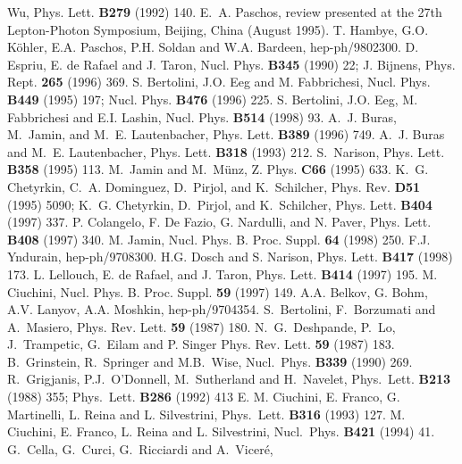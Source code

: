 \begin{thebibliography}{999}
{  Wu},
{ Phys. Lett.} {\bf B279} (1992) 140.
{ E.~A. Paschos},
 review presented at the 27th Lepton-Photon Symposium,
  Beijing, China (August 1995).
T. Hambye, G.O. K\"ohler, E.A. Paschos, P.H. Soldan and W.A. Bardeen,
hep-ph/9802300.
D. Espriu, E. de Rafael and J. Taron, { Nucl. Phys.} {\bf B345} (1990) 22;
J. Bijnens, Phys. Rept. {\bf 265} (1996) 369.
S. Bertolini, J.O. Eeg and  M. Fabbrichesi,
{ Nucl. Phys.} {\bf B449} (1995) 197;
{ Nucl. Phys.} {\bf B476} (1996) 225.
S. Bertolini, J.O. Eeg, M. Fabbrichesi and E.I. Lashin,
{ Nucl. Phys.} {\bf B514} (1998) 93.
{ A.~J. Buras}, { M.~Jamin}, and { M.~E. Lautenbacher},
{ Phys. Lett.} {\bf B389} (1996) 749.
{ A.~J. Buras} and { M.~E. Lautenbacher},
{ Phys. Lett.} {\bf B318} (1993) 212.
{ S.~Narison},
{ Phys. Lett.} {\bf B358} (1995) 113.
{ M.~Jamin} and { M.~M{\"u}nz},
 { Z. Phys.} {\bf C66} (1995) 633.
K.~G. Chetyrkin, C.~A. Dominguez,  D.~Pirjol, and 
  K.~Schilcher,
{ Phys. Rev.} {\bf D51} (1995) 5090;
K.~G. Chetyrkin, D.~Pirjol, and 
  K.~Schilcher,
{ Phys. Lett.} {\bf B404} (1997) 337.
P. Colangelo, F. De Fazio, G. Nardulli, and N. Paver,
{ Phys. Lett.} {\bf B408} (1997) 340.
M. Jamin, Nucl. Phys. B. Proc. Suppl. {\bf 64} (1998) 250.
F.J. Yndurain, hep-ph/9708300.
H.G. Dosch and S. Narison, { Phys. Lett.} {\bf B417} (1998) 173.
L. Lellouch, E. de Rafael, and J. Taron, 
{ Phys. Lett.} {\bf B414} (1997) 195.
{ M. Ciuchini}, Nucl. Phys. B. Proc. Suppl. {\bf 59} (1997) 149.
A.A. Belkov, G. Bohm, A.V. Lanyov, A.A. Moshkin, hep-ph/9704354.
{ S.~Bertolini, F.~Borzumati and A.~Masiero,} 
{ Phys. Rev. Lett.} {\bf 59} (1987) 180.
{ N.~G.~Deshpande, P.~Lo, J.~Trampetic, G.~Eilam and P. Singer}
{ Phys. Rev. Lett.} {\bf 59} (1987) 183.
{ B.~Grinstein, R.~Springer and M.B.~Wise,} 
{ Nucl.~Phys.} {\bf B339} (1990) 269.
{ R.~Grigjanis, P.J.~O'Donnell, M.~Sutherland and H.~Navelet,} 
{ Phys.~Lett.} {\bf B213} (1988) 355;
{ Phys.~Lett.} {\bf B286} (1992) 413 E.
{ M. Ciuchini, E. Franco, G. Martinelli, L. Reina and L. Silvestrini,}
 { Phys.~Lett.} {\bf B316} (1993) 127.
{ M. Ciuchini, E. Franco, L. Reina and L. Silvestrini,}
{ Nucl.~Phys.} {\bf B421} (1994) 41.
{ G.~Cella, G.~Curci, G.~Ricciardi and  A.~Vicer{\'e},}

\end{thebibliography}
